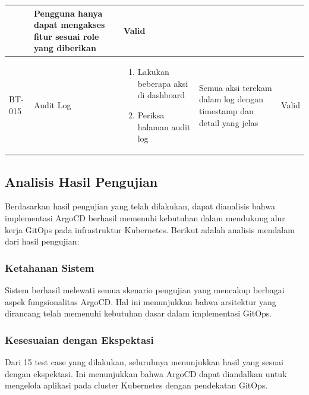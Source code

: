 \begin{table}[H]
\begin{adjustbox}{width=\textwidth}
\begin{tabular}{|p{0.8cm}|p{2.2cm}|p{4cm}|p{3.5cm}|p{1.2cm}|}
\begin{enumerate}[leftmargin=*,noitemsep,topsep=0pt,label=\arabic*.,widest=99]
                                                          \end{enumerate} & Pengguna hanya dapat mengakses fitur sesuai role yang diberikan     & Valid                                                                          \\ \hline
            BT-015            & Audit Log               & \begin{enumerate}[leftmargin=*,noitemsep,topsep=0pt,label=\arabic*.,widest=99]
                                                              \item Lakukan beberapa aksi di dashboard
                                                              \item Periksa halaman audit log
                                                          \end{enumerate} & Semua aksi terekam dalam log dengan timestamp dan detail yang jelas & Valid                                                                          \\ \hline
        \end{tabular}
    \end{adjustbox}
\end{table}

\subsection{Analisis Hasil Pengujian}\label{subsec:analisis_hasil}
Berdasarkan hasil pengujian yang telah dilakukan, dapat dianalisis bahwa implementasi ArgoCD berhasil memenuhi kebutuhan dalam mendukung alur kerja GitOps pada infrastruktur Kubernetes. Berikut adalah analisis mendalam dari hasil pengujian:

\subsubsection{Ketahanan Sistem}
Sistem berhasil melewati semua skenario pengujian yang mencakup berbagai aspek fungsionalitas ArgoCD. Hal ini menunjukkan bahwa arsitektur yang dirancang telah memenuhi kebutuhan dasar dalam implementasi GitOps.

\subsubsection{Kesesuaian dengan Ekspektasi}
Dari 15 test case yang dilakukan, seluruhnya menunjukkan hasil yang sesuai dengan ekspektasi. Ini menunjukkan bahwa ArgoCD dapat diandalkan untuk mengelola aplikasi pada cluster Kubernetes dengan pendekatan GitOps.

